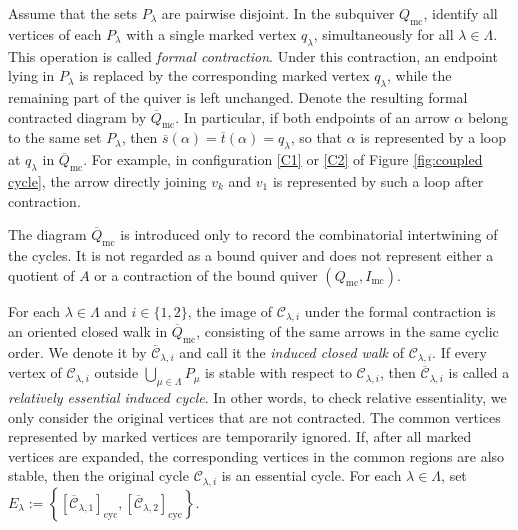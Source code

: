 \documentclass[11pt]{amsart}
\numberwithin{equation}{section}
\theoremstyle{definition}
\begin{document}
Assume that the sets \(P_\lambda\) are pairwise disjoint. In the
subquiver \(Q_{\mathrm{mc}}\), identify all vertices of each
\(P_\lambda\) with a single marked vertex \(q_\lambda\),
simultaneously for all \(\lambda\in\Lambda\). This operation is
called \emph{formal contraction}. Under this contraction, an
endpoint lying in \(P_\lambda\) is replaced by the corresponding
marked vertex \(q_\lambda\), while the remaining part of the quiver
is left unchanged. Denote the resulting formal contracted diagram by $\overline Q_{\mathrm{mc}}$. In particular, if both endpoints of an arrow \(\alpha\) belong to
the same set \(P_\lambda\), then
$\overline s(\alpha)=\overline t(\alpha)=q_\lambda$, so that \(\alpha\) is represented by a loop at \(q_\lambda\) in
\(\overline Q_{\mathrm{mc}}\). For example, in configuration
\ref{C1} or \ref{C2} of Figure \ref{fig:coupled cycle}, the arrow
directly joining \(v_k\) and \(v_1\) is represented by such a loop
after contraction.

The diagram \(\overline Q_{\mathrm{mc}}\) is introduced only to
record the combinatorial intertwining of the cycles. It is not
regarded as a bound quiver and does not represent either a quotient
of \(A\) or a contraction of the bound quiver
\((Q_{\mathrm{mc}},I_{\mathrm{mc}})\).

For each \(\lambda\in\Lambda\) and \(i\in\{1,2\}\), the image of
\(\mathcal C_{\lambda,i}\) under the formal contraction is an
oriented closed walk in \(\overline Q_{\mathrm{mc}}\), consisting of
the same arrows in the same cyclic order. We denote it by
\(\overline{\mathcal C}_{\lambda,i}\) and call it the
\emph{induced closed walk} of \(\mathcal C_{\lambda,i}\).
If every vertex of \(\mathcal C_{\lambda,i}\) outside $\bigcup_{\mu\in\Lambda}P_\mu$ is stable with respect to \(\mathcal C_{\lambda,i}\), then
\(\overline{\mathcal C}_{\lambda,i}\) is called a
\emph{relatively essential induced cycle}. In other words, to check relative essentiality, we only consider the original vertices that are not contracted. The common vertices represented by marked vertices are temporarily ignored. If, after all marked vertices are expanded, the corresponding vertices in the common regions are also stable, then the original cycle \(\mathcal C_{\lambda,i}\) is an essential cycle. For each $\lambda\in\Lambda$, set $E_\lambda:=\left\{[\overline{\mathcal C}_{\lambda,1}]_{\mathrm{cyc}},[\overline{\mathcal C}_{\lambda,2}]_{\mathrm{cyc}}\right\}$.
\end{document}
